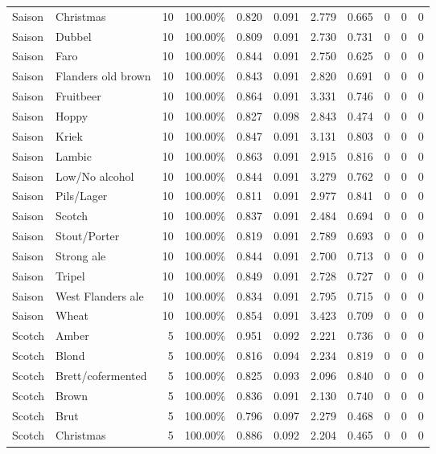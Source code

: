 {\begin{longtable}{llrrrrrrrrr}
Saison & Christmas & 10 & 100.00\% & 0.820 & 0.091 & 2.779 & 0.665 & 0 & 0 & 0 \\
Saison & Dubbel & 10 & 100.00\% & 0.809 & 0.091 & 2.730 & 0.731 & 0 & 0 & 0 \\
Saison & Faro & 10 & 100.00\% & 0.844 & 0.091 & 2.750 & 0.625 & 0 & 0 & 0 \\
Saison & Flanders old brown & 10 & 100.00\% & 0.843 & 0.091 & 2.820 & 0.691 & 0 & 0 & 0 \\
Saison & Fruitbeer & 10 & 100.00\% & 0.864 & 0.091 & 3.331 & 0.746 & 0 & 0 & 0 \\
Saison & Hoppy & 10 & 100.00\% & 0.827 & 0.098 & 2.843 & 0.474 & 0 & 0 & 0 \\
Saison & Kriek & 10 & 100.00\% & 0.847 & 0.091 & 3.131 & 0.803 & 0 & 0 & 0 \\
Saison & Lambic & 10 & 100.00\% & 0.863 & 0.091 & 2.915 & 0.816 & 0 & 0 & 0 \\
Saison & Low/No alcohol & 10 & 100.00\% & 0.844 & 0.091 & 3.279 & 0.762 & 0 & 0 & 0 \\
Saison & Pils/Lager & 10 & 100.00\% & 0.811 & 0.091 & 2.977 & 0.841 & 0 & 0 & 0 \\
Saison & Scotch & 10 & 100.00\% & 0.837 & 0.091 & 2.484 & 0.694 & 0 & 0 & 0 \\
Saison & Stout/Porter & 10 & 100.00\% & 0.819 & 0.091 & 2.789 & 0.693 & 0 & 0 & 0 \\
Saison & Strong ale & 10 & 100.00\% & 0.844 & 0.091 & 2.700 & 0.713 & 0 & 0 & 0 \\
Saison & Tripel & 10 & 100.00\% & 0.849 & 0.091 & 2.728 & 0.727 & 0 & 0 & 0 \\
Saison & West Flanders ale & 10 & 100.00\% & 0.834 & 0.091 & 2.795 & 0.715 & 0 & 0 & 0 \\
Saison & Wheat & 10 & 100.00\% & 0.854 & 0.091 & 3.423 & 0.709 & 0 & 0 & 0 \\
Scotch & Amber & 5 & 100.00\% & 0.951 & 0.092 & 2.221 & 0.736 & 0 & 0 & 0 \\
Scotch & Blond & 5 & 100.00\% & 0.816 & 0.094 & 2.234 & 0.819 & 0 & 0 & 0 \\
Scotch & Brett/cofermented & 5 & 100.00\% & 0.825 & 0.093 & 2.096 & 0.840 & 0 & 0 & 0 \\
Scotch & Brown & 5 & 100.00\% & 0.836 & 0.091 & 2.130 & 0.740 & 0 & 0 & 0 \\
Scotch & Brut & 5 & 100.00\% & 0.796 & 0.097 & 2.279 & 0.468 & 0 & 0 & 0 \\
Scotch & Christmas & 5 & 100.00\% & 0.886 & 0.092 & 2.204 & 0.465 & 0 & 0 & 0 \\

\end{longtable}}
